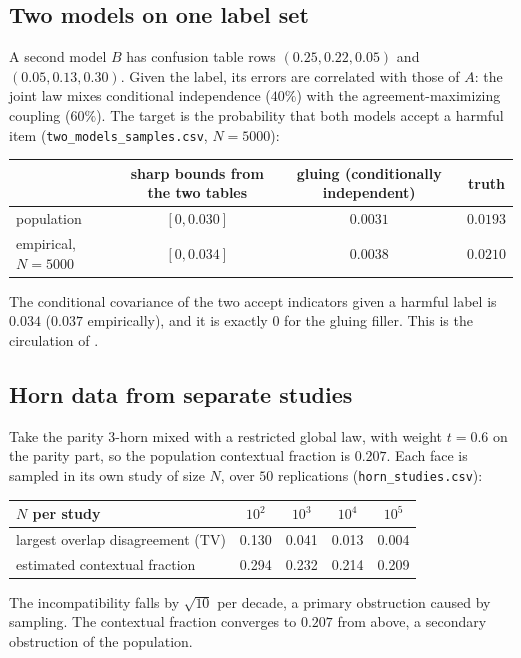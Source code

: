 \documentclass[11pt]{article}
\theoremstyle{definition}
\theoremstyle{remark}
\begin{document}
\subsection{Two models on one label set}
A second model $B$ has confusion table rows $(0.25,0.22,0.05)$ and $(0.05,0.13,0.30)$. Given the label, its errors are
correlated with those of $A$: the joint law mixes conditional independence ($40\%$) with the agreement-maximizing
coupling ($60\%$). The target is the probability that both models accept a harmful item (\texttt{two\_models\_samples.csv},
$N=5000$):
\begin{center}\small
\begin{tabular}{@{}lccc@{}}
\toprule
& sharp bounds from the two tables & gluing (conditionally independent) & truth\\
\midrule
population & $[0,0.030]$ & $0.0031$ & $0.0193$\\
empirical, $N=5000$ & $[0,0.034]$ & $0.0038$ & $0.0210$\\
\bottomrule
\end{tabular}
\end{center}
The conditional covariance of the two accept indicators given a harmful label is $0.034$ ($0.037$ empirically), and it
is exactly $0$ for the gluing filler. This is the circulation of \cite[Prop.~12.3(iii)]{Conditionals}.

\subsection{Horn data from separate studies}
Take the parity 3-horn mixed with a restricted global law, with weight $t=0.6$ on the parity part, so the population
contextual fraction is $0.207$. Each face is sampled in its own study of size $N$, over $50$ replications
(\texttt{horn\_studies.csv}):
\begin{center}\small
\begin{tabular}{@{}lcccc@{}}
\toprule
$N$ per study & $10^2$ & $10^3$ & $10^4$ & $10^5$\\
\midrule
largest overlap disagreement (TV) & 0.130 & 0.041 & 0.013 & 0.004\\
estimated contextual fraction & 0.294 & 0.232 & 0.214 & 0.209\\
\bottomrule
\end{tabular}
\end{center}
The incompatibility falls by $\sqrt{10}$ per decade, a primary obstruction caused by sampling. The contextual fraction
converges to $0.207$ from above, a secondary obstruction of the population.
\end{document}
